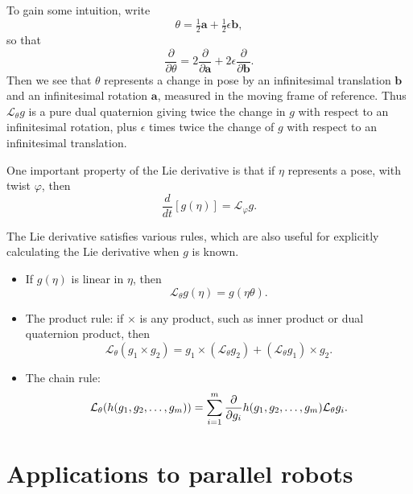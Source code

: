 \documentclass[reqno,12pt]{amsart}
\newcommand{\liederiv}{\mathcal L}
\begin{document}
To gain some intuition, write
\begin{equation}
\label{decomp theta}
\theta = \tfrac12\bm a + \tfrac12\epsilon \bm b,
\end{equation}
so that
\begin{equation}
\label{decomp partial theta}
\frac{\partial}{\partial \theta} = 2\frac{\partial}{\partial \bm a} + 2\epsilon \frac{\partial}{\partial \bm b}.
\end{equation}
Then we see that $\theta$ represents a change in pose by an infinitesimal translation $\bm b$ and an infinitesimal rotation $\bm a$, measured in the moving frame of reference.  Thus $\liederiv_\theta g$ is a pure dual quaternion giving twice the change in $g$ with respect to an infinitesimal rotation, plus $\epsilon$ times twice the change of $g$ with respect to an infinitesimal translation.

One important property of the Lie derivative is that if $\eta$ represents a pose, with twist $\varphi$, then
\begin{equation}
\label{dot f Lie phi}
\frac d{dt} [g(\eta)] = \liederiv_\varphi g .
\end{equation}

The Lie derivative satisfies various rules, which are also useful for explicitly calculating the Lie derivative when $g$ is known.
\begin{itemize}
\item If $g(\eta)$ is linear in $\eta$, then
\begin{equation}
\label{rule linear}
\liederiv_\theta g(\eta) = g(\eta \theta).
\end{equation}
\item The product rule: if $\times$ is any product, such as inner product or dual quaternion product, then
\begin{equation}
\liederiv_\theta (g_1 \times g_2) = g_1 \times (\liederiv_\theta g_2) + (\liederiv_\theta g_1) \times g_2.
\end{equation}
\item The chain rule:
\begin{equation}
\liederiv_\theta (h(g_1, g_2,\dots,g_m)) \\ = \sum_{i=1}^m
\frac\partial{\partial g_i} h(g_1, g_2,\dots,g_m) \liederiv_\theta g_i .
\end{equation}
\end{itemize}

\section{Applications to parallel robots}
\end{document}
